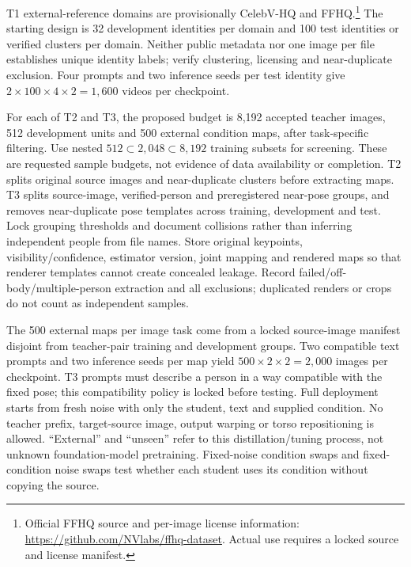 \documentclass{article}
\begin{document}
T1 external-reference domains are provisionally CelebV-HQ \cite{celebvhq} and FFHQ.\footnote{Official FFHQ source and per-image license information: \url{https://github.com/NVlabs/ffhq-dataset}. Actual use requires a locked source and license manifest.} The starting design is 32 development identities per domain and 100 test identities or verified clusters per domain. Neither public metadata nor one image per file establishes unique identity labels; verify clustering, licensing and near-duplicate exclusion. Four prompts and two inference seeds per test identity give $2\times100\times4\times2=1{,}600$ videos per checkpoint.

For each of T2 and T3, the proposed budget is 8,192 accepted teacher images, 512 development units and 500 external condition maps, after task-specific filtering. Use nested $512\subset2{,}048\subset8{,}192$ training subsets for screening. These are requested sample budgets, not evidence of data availability or completion. T2 splits original source images and near-duplicate clusters before extracting maps. T3 splits source-image, verified-person and preregistered near-pose groups, and removes near-duplicate pose templates across training, development and test. Lock grouping thresholds and document collisions rather than inferring independent people from file names. Store original keypoints, visibility/confidence, estimator version, joint mapping and rendered maps so that renderer templates cannot create concealed leakage. Record failed/off-body/multiple-person extraction and all exclusions; duplicated renders or crops do not count as independent samples.

The 500 external maps per image task come from a locked source-image manifest disjoint from teacher-pair training and development groups. Two compatible text prompts and two inference seeds per map yield $500\times2\times2=2{,}000$ images per checkpoint. T3 prompts must describe a person in a way compatible with the fixed pose; this compatibility policy is locked before testing. Full deployment starts from fresh noise with only the student, text and supplied condition. No teacher prefix, target-source image, output warping or torso repositioning is allowed. ``External'' and ``unseen'' refer to this distillation/tuning process, not unknown foundation-model pretraining. Fixed-noise condition swaps and fixed-condition noise swaps test whether each student uses its condition without copying the source.
\end{document}
